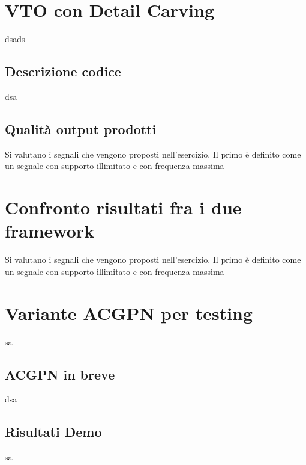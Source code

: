 \documentclass[final, 11pt]{article}
\begin{document}
	\newpage
	\section{VTO con Detail Carving}
	dsads
	\subsection{Descrizione codice}	
	dsa
	\subsection{Qualità output prodotti}
	Si valutano i segnali che vengono proposti nell'esercizio. Il primo è definito come un segnale con supporto illimitato e con frequenza massima 
	
	\newpage
	\section{Confronto risultati fra i due framework}	
	Si valutano i segnali che vengono proposti nell'esercizio. Il primo è definito come un segnale con supporto illimitato e con frequenza massima 
	
	\newpage
	\section{Variante ACGPN per testing}
	sa
	\subsection{ACGPN in breve}
	dsa
	\subsection{Risultati Demo}
	sa
	
\end{document}
